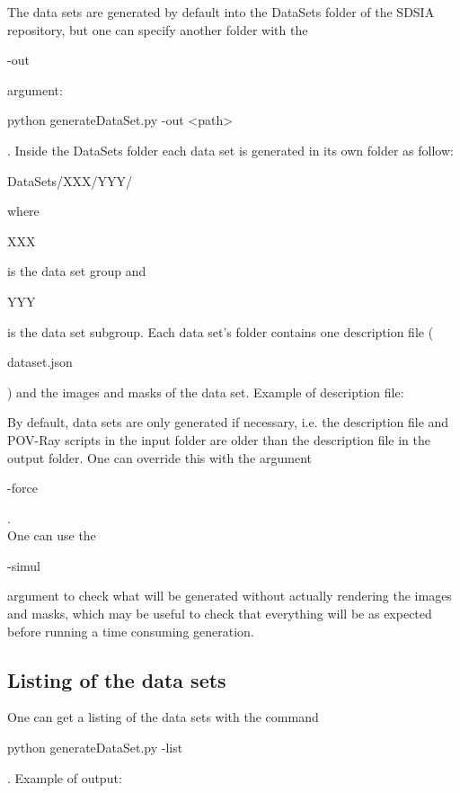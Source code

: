 The data sets are generated by default into the DataSets folder of the SDSIA repository, but one can specify another folder with the \begin{ttfamily}-out\end{ttfamily} argument: \begin{ttfamily}python generateDataSet.py -out <path>\end{ttfamily} . Inside the DataSets folder each data set is generated in its own folder as follow: \begin{ttfamily}DataSets/XXX/YYY/\end{ttfamily} where \begin{ttfamily}XXX\end{ttfamily} is the data set group and \begin{ttfamily}YYY\end{ttfamily} is the data set subgroup. Each data set's folder contains one description file (\begin{ttfamily}dataset.json\end{ttfamily}) and the images and masks of the data set. Example of description file:\\
\begin{scriptsize}
\begin{ttfamily}

\end{ttfamily}
\end{scriptsize}

By default, data sets are only generated if necessary, i.e. the description file and POV-Ray scripts in the input folder are older than the description file in the output folder. One can override this with the argument \begin{ttfamily}-force\end{ttfamily}.\\

One can use the \begin{ttfamily}-simul\end{ttfamily} argument to check what will be generated without actually rendering the images and masks, which may be useful to check that everything will be as expected before running a time consuming generation.\\

\subsection{Listing of the data sets}

One can get a listing of the data sets with the command \begin{ttfamily}python generateDataSet.py -list\end{ttfamily}. Example of output:\\
\begin{scriptsize}
\begin{ttfamily}

\end{ttfamily}
\end{scriptsize}

